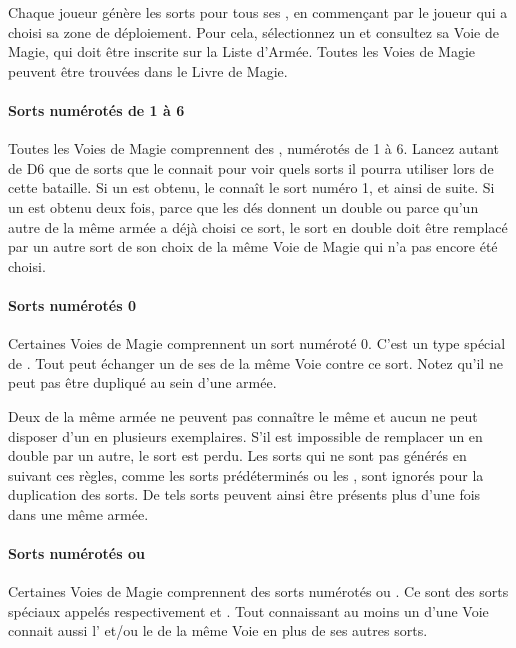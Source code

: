 Chaque joueur génère les sorts pour tous ses \wizards{}, en commençant par le joueur qui a choisi sa zone de déploiement. Pour cela, sélectionnez un \wizard{} et consultez sa Voie de Magie, qui doit être inscrite sur la Liste d'Armée. Toutes les Voies de Magie peuvent être trouvées dans le Livre de Magie.

\paragraph{Sorts numérotés de 1 à 6}

Toutes les Voies de Magie comprennent des \og \learnedspells{} \fg{}, numérotés de 1 à 6. Lancez autant de D6 que de sorts que le \wizard{} connait pour voir quels sorts il pourra utiliser lors de cette bataille. Si un  est obtenu, le \wizard{} connaît le sort numéro 1, et ainsi de suite. Si un \learnedspell{} est obtenu deux fois, parce que les dés donnent un double ou parce qu'un autre \wizard{} de la même armée a déjà choisi ce sort, le sort en double doit être remplacé par un autre sort de son choix de la même Voie de Magie qui n'a pas encore été choisi.

\paragraph{Sorts numérotés 0}

Certaines Voies de Magie comprennent un sort numéroté 0. C'est un type spécial de \learnedspell{}. Tout \wizard{} peut échanger un de ses \learnedspells{} de la même Voie contre ce sort. Notez qu'il ne peut pas être dupliqué au sein d'une armée.

Deux \wizards{} de la même armée ne peuvent pas connaître le même \learnedspell{} et aucun \wizard{} ne peut disposer d'un \learnedspell{} en plusieurs exemplaires. S'il est impossible de remplacer un \learnedspell{} en double par un autre, le sort est perdu. Les sorts qui ne sont pas générés en suivant ces règles, comme les sorts prédéterminés ou les \boundspells{}, sont ignorés pour la duplication des sorts. De tels sorts peuvent ainsi être présents plus d'une fois dans une même armée.

\paragraph{Sorts numérotés \og \attributespellnumber{} \fg{} ou \og \traitspellnumber{} \fg{}}

Certaines Voies de Magie comprennent des sorts numérotés \og \attributespellnumber{} \fg{} ou \og \traitspellnumber{} \fg{}. Ce sont des sorts spéciaux appelés respectivement \attributespells{} et \traitspells{}. Tout \wizard{} connaissant au moins un \learnedspell{} d'une Voie connait aussi l'\attributespell{} et/ou le \traitspell{} de la même Voie en plus de ses autres sorts.

